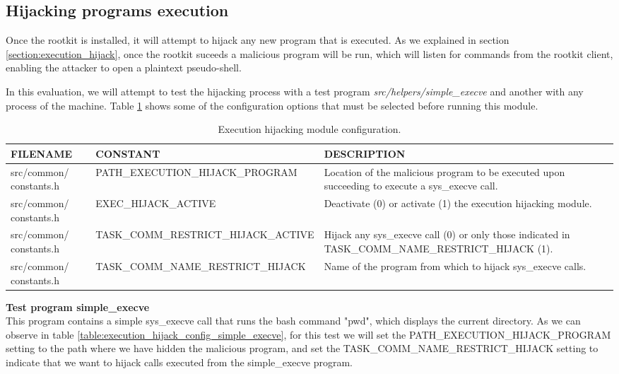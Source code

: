 \subsection{Hijacking programs execution}
Once the rootkit is installed, it will attempt to hijack any new program that is executed. As we explained in section \ref{section:execution_hijack}, once the rootkit suceeds a malicious program will be run, which will listen for commands from the rootkit client, enabling the attacker to open a plaintext pseudo-shell. 

In this evaluation, we will attempt to test the hijacking process with a test program \textit{src/helpers/simple\_execve} and another with any process of the machine. Table \ref{table:execution_hijack_config} shows some of the configuration options that must be selected before running this module.

\begin{table}[htbp]
\begin{tabular}{|>{\centering\arraybackslash}p{3cm}|>{\centering\arraybackslash}p{4.5cm}|>{\centering\arraybackslash}p{6cm}|}
\hline
\textbf{FILENAME} & \textbf{CONSTANT} & \textbf{DESCRIPTION}\\
\hline
\hline
src/common/ constants.h & PATH\_EXECUTION\_HIJACK\_PROGRAM & Location of the malicious program to be executed upon succeeding to execute a sys\_execve call.\\
\hline
src/common/ constants.h & EXEC\_HIJACK\_ACTIVE & Deactivate (0) or activate (1) the execution hijacking module.\\
\hline
src/common/ constants.h & TASK\_COMM\_RESTRICT\_HIJACK\_ACTIVE  & Hijack any sys\_execve call (0) or only those indicated in TASK\_COMM\_NAME\_RESTRICT\_HIJACK (1).\\
\hline
src/common/ constants.h & TASK\_COMM\_NAME\_RESTRICT\_HIJACK & Name of the program from which to hijack sys\_execve calls.\\
\hline
\end{tabular}
\caption{Execution hijacking module configuration.}
\label{table:execution_hijack_config}
\end{table}


\textbf{Test program simple\_execve}\\
This program contains a simple sys\_execve call that runs the bash command "pwd", which displays the current directory. As we can observe in table \ref{table:execution_hijack_config_simple_execve}, for this test we will set the PATH\_EXECUTION\_HIJACK\_PROGRAM setting to the path where we have hidden the malicious program, and set the TASK\_COMM\_NAME\_RESTRICT\_HIJACK setting to indicate that we want to hijack calls executed from the simple\_execve program.

